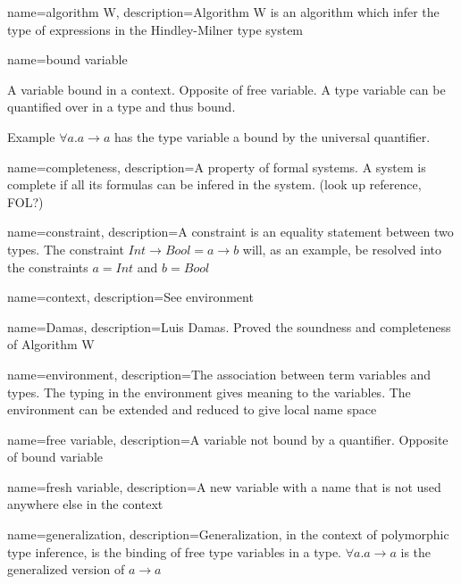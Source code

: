 
%


%




{ name={algorithm W},
  description={Algorithm W is an algorithm which infer the type of expressions in the Hindley-Milner type system}
}

{ name={bound variable} }
{A variable bound in a context. Opposite of free variable. A type variable can be quantified over in a type and thus bound.

Example $\forall a . a \to a$ has the type variable a bound by the universal quantifier.}

{ name={completeness},
  description={A property of formal systems. A system is complete if all its formulas can be infered in the system.
(look up reference, FOL?)}
}

{ name={constraint},
  description={A constraint is an equality statement between two types. The constraint $Int \to Bool = a \to b$ will, as an example, be resolved into the constraints $a = Int$ and $b = Bool$}
}

{ name={context},
  description={See environment}
}

{ name={Damas},
  description={Luis Damas. Proved the soundness and completeness of Algorithm W}
} %

{ name={environment},
  description={The association between term variables and types. The typing in the environment gives meaning to the variables. The environment can be extended and reduced to give local name space}
}

{ name={free variable},
  description={A variable not bound by a quantifier. Opposite of bound variable}
}

{ name={fresh variable},
  description={A new variable with a name that is not used anywhere else in the context}
}

{ name={generalization},
  description={Generalization, in the context of polymorphic type inference, is the binding of free type variables in a type. $\forall a . a \to a$ is the generalized version of $a \to a$}
}

